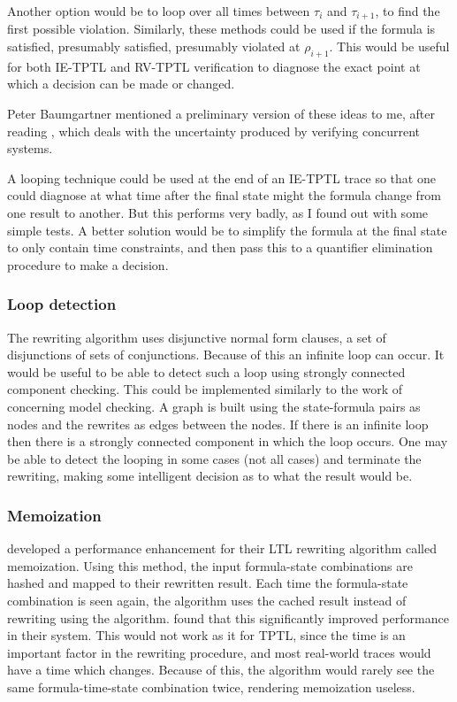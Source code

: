 \documentclass[a4paper]{article}
\begin{document}
Another option would be to loop over all times between $\tau_i$ and $\tau_{i+1}$, to find the first possible violation. Similarly, these methods could be used if the formula is satisfied, presumably satisfied, presumably violated at $\rho_{i+1}$. This would be useful for both IE-TPTL and RV-TPTL verification to diagnose the exact point at which a decision can be made or changed.

Peter Baumgartner mentioned a preliminary version of these ideas to me, after reading \textcite{chai2014fivevalued}, which deals with the uncertainty produced by verifying concurrent systems.

A looping technique could be used at the end of an IE-TPTL trace so that one could diagnose at what time after the final state might the formula change from one result to another. But this performs very badly, as I found out with some simple tests. A better solution would be to simplify the formula at the final state to only contain time constraints, and then pass this to a quantifier elimination procedure to make a decision.

\subsubsection{Loop detection}
The rewriting algorithm uses disjunctive normal form clauses, a set of disjunctions of sets of conjunctions. Because of this an infinite loop can occur. It would be useful to be able to detect such a loop using strongly connected component checking. This could be implemented similarly to the work of \textcite{lichtenstein1985checking} concerning model checking. A graph is built using the state-formula pairs as nodes and the rewrites as edges between the nodes. If there is an infinite loop then there is a strongly connected component in which the loop occurs. One may be able to detect the looping in some cases (not all cases) and terminate the rewriting, making some intelligent decision as to what the result would be.

\subsubsection{Memoization}
\textcite[180]{rosu2005rewriting} developed a performance enhancement for their LTL rewriting algorithm called memoization. Using this method, the input formula-state combinations are hashed and mapped to their rewritten result. Each time the formula-state combination is seen again, the algorithm uses the cached result instead of rewriting using the algorithm. \citeauthor{rosu2005rewriting} found that this significantly improved performance in their system. This would not work as it for TPTL, since the time is an important factor in the rewriting procedure, and most real-world traces would have a time which changes. Because of this, the algorithm would rarely see the same formula-time-state combination twice, rendering memoization useless.
\end{document}
